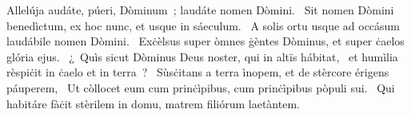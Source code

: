 { Allelúja}
{%
audáte, púeri, Dòminum~; laudáte nomen Dòmini. 
~Sit nomen Dòmini benedìctum, ex hoc nunc, et usque in sáeculum. 
~A solis ortu usque ad occásum laudábile nomen Dòmini. 
~Exċèlsus super òmnes ġèntes Dòminus, et super ċaelos glória ejus. 
~¿~Quìs sicut Dòminus Deus noster, qui in altïs hábitat, 
~et humìlia rèspiċit in ċaelo et in terra~? 
~Sùsċitans a terra ìnopem, et de stèrcore érigens páuperem, 
~Ut còllocet eum cum prinċìpibus, cum prinċìpibus pòpuli sui. 
~Qui habitáre fàċit stèrilem in domu, matrem filiórum laetàntem. 
}
